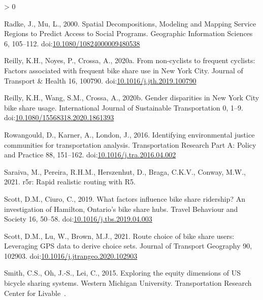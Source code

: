 \documentclass[]{elsarticle} %
\newlength{\cslhangindent}
\newenvironment{CSLReferences}[2] %
 {%
  \setlength{\parindent}{0pt}
  \ifodd #1 \everypar{\setlength{\hangindent}{\cslhangindent}}\ignorespaces\fi
  \ifnum #2 > 0
  \setlength{\parskip}{#2\baselineskip}
  \fi
 }%
 {}
\providecommand{\DIFaddend}{} %
\DeclareRobustCommand{\DIFaddend}{\DIFOaddend \let\includegraphics\DIFOincludegraphics} %
\begin{document}
\begin{CSLReferences}{1}{0}
\leavevmode\DIFaddend \hypertarget{ref-radkeSpatialDecompositionsModeling2000}{}%
Radke, J., Mu, L., 2000. Spatial {Decompositions}, {Modeling} and
{Mapping Service Regions} to {Predict Access} to {Social Programs}.
Geographic Information Sciences 6, 105--112.
doi:\href{https://doi.org/10.1080/10824000009480538}{10.1080/10824000009480538}

\leavevmode\hypertarget{ref-reillyNoncyclistsFrequentCyclists2020}{}%
Reilly, K.H., Noyes, P., Crossa, A., 2020a. From non-cyclists to
frequent cyclists: {Factors} associated with frequent bike share use in
{New York City}. Journal of Transport \& Health 16, 100790.
doi:\href{https://doi.org/10.1016/j.jth.2019.100790}{10.1016/j.jth.2019.100790}

\leavevmode\hypertarget{ref-reillyGenderDisparitiesNew2020}{}%
Reilly, K.H., Wang, S.M., Crossa, A., 2020b. Gender disparities in {New
York City} bike share usage. International Journal of Sustainable
Transportation 0, 1--9.
doi:\href{https://doi.org/10.1080/15568318.2020.1861393}{10.1080/15568318.2020.1861393}

\leavevmode\hypertarget{ref-rowangouldIdentifyingEnvironmentalJustice2016}{}%
Rowangould, D., Karner, A., London, J., 2016. Identifying environmental
justice communities for transportation analysis. Transportation Research
Part A: Policy and Practice 88, 151--162.
doi:\href{https://doi.org/10.1016/j.tra.2016.04.002}{10.1016/j.tra.2016.04.002}

\leavevmode\hypertarget{ref-R-r5r}{}%
Saraiva, M., Pereira, R.H.M., Herszenhut, D., Braga, C.K.V., Conway,
M.W., 2021. r5r: Rapid realistic routing with R5.

\leavevmode\hypertarget{ref-scottWhatFactorsInfluence2019}{}%
Scott, D.M., Ciuro, C., 2019. What factors influence bike share
ridership? {An} investigation of {Hamilton}, {Ontario}'s bike share
hubs. Travel Behaviour and Society 16, 50--58.
doi:\href{https://doi.org/10.1016/j.tbs.2019.04.003}{10.1016/j.tbs.2019.04.003}

\leavevmode\hypertarget{ref-scottRouteChoiceBike2021}{}%
Scott, D.M., Lu, W., Brown, M.J., 2021. Route choice of bike share
users: Leveraging GPS data to derive choice sets. Journal of Transport
Geography 90, 102903.
doi:\href{https://doi.org/10.1016/j.jtrangeo.2020.102903}{10.1016/j.jtrangeo.2020.102903}

\leavevmode\hypertarget{ref-smith2015exploring}{}%
Smith, C.S., Oh, J.-S., Lei, C., 2015. Exploring the equity dimensions
of US bicycle sharing systems. Western Michigan University.
Transportation Research Center for Livable~.


\end{CSLReferences}
\end{document}
